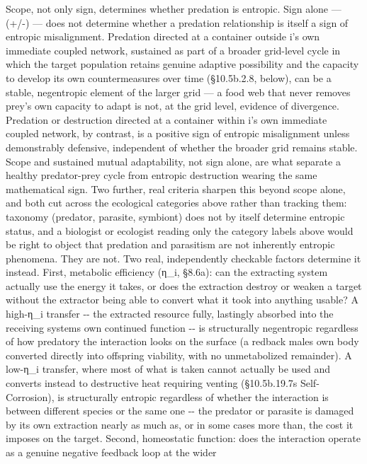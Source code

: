 \documentclass[
]{article}
\begin{document}
Scope, not only sign, determines whether predation is entropic. Sign
alone --- (+/-) --- does not determine whether a predation relationship
is itself a sign of entropic misalignment. Predation directed at a
container outside i's own immediate coupled network, sustained as part
of a broader grid-level cycle in which the target population retains
genuine adaptive possibility and the capacity to develop its own
countermeasures over time (§10.5b.2.8, below), can be a stable,
negentropic element of the larger grid --- a food web that never removes
prey's own capacity to adapt is not, at the grid level, evidence of
divergence. Predation or destruction directed at a container within i's
own immediate coupled network, by contrast, is a positive sign of
entropic misalignment unless demonstrably defensive, independent of
whether the broader grid remains stable. Scope and sustained mutual
adaptability, not sign alone, are what separate a healthy predator-prey
cycle from entropic destruction wearing the same mathematical sign. Two
further, real criteria sharpen this beyond scope alone, and both cut
across the ecological categories above rather than tracking them:
taxonomy (predator, parasite, symbiont) does not by itself determine
entropic status, and a biologist or ecologist reading only the category
labels above would be right to object that predation and parasitism are
not inherently entropic phenomena. They are not. Two real, independently
checkable factors determine it instead. First, metabolic efficiency
(η\_i, §8.6a): can the extracting system actually use the energy it
takes, or does the extraction destroy or weaken a target without the
extractor being able to convert what it took into anything usable? A
high-η\_i transfer -\/- the extracted resource fully, lastingly absorbed
into the receiving system\textquotesingle s own continued function -\/-
is structurally negentropic regardless of how predatory the interaction
looks on the surface (a redback male\textquotesingle s own body
converted directly into offspring viability, with no unmetabolized
remainder). A low-η\_i transfer, where most of what is taken cannot
actually be used and converts instead to destructive heat requiring
venting (§10.5b.19.7\textquotesingle s Self-Corrosion), is structurally
entropic regardless of whether the interaction is between different
species or the same one -\/- the predator or parasite is damaged by its
own extraction nearly as much as, or in some cases more than, the cost
it imposes on the target. Second, homeostatic function: does the
interaction operate as a genuine negative feedback loop at the wider
\end{document}
